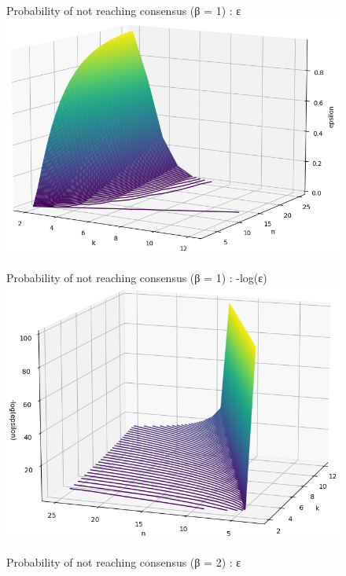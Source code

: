 \documentclass[11pt, twocolumn]{article}
\begin{document}
\begin{appendices}
    
    
    \label{Appendices}
    \begin{figure}
        Probability of not reaching consensus (β = 1) : ε
        \centering
        \includegraphics[width=16.5cm]{images/smallNoConsensusBetaOne.png}
    \end{figure}
    \begin{figure}
        Probability of not reaching consensus (β = 1) : -log(ε)
        \centering
        \includegraphics[width=16.5cm]{images/smalllogNoConsensusBetaOne.png}
    \end{figure}
    \begin{figure}
        Probability of not reaching consensus (β = 2) : ε

\end{figure}
\end{appendices}
\end{document}
